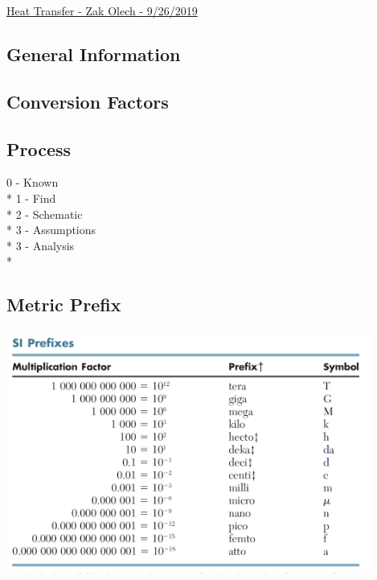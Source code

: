\documentclass[10pt,landscape]{article}
\newenvironment{Figure}
     {\par\medskip\noindent\minipage{\linewidth}}
     {\endminipage\par\medskip}
\begin{document}
\raggedright
\footnotesize


\begin{center}
     \Large{\underline{Heat Transfer - Zak Olech - 9/26/2019}}
\end{center}
\begin{multicols}{3}

\setlength{\columnseprule}{0.25pt}
\setlength{\premulticols}{1pt}
\setlength{\postmulticols}{1pt}
\setlength{\multicolsep}{1pt}
\setlength{\columnsep}{2pt}


\section{General Information}
\subsection{Conversion Factors}

\subsection{Process}
0 - Known\\*
1 - Find\\*
2 - Schematic\\*
3 - Assumptions\\*
3 - Analysis\\*
\subsection{Metric Prefix}
\begin{Figure}
    \centering
    \includegraphics[width=\linewidth, height=8cm]{SI_Prefix.png}
\end{Figure}


\end{multicols}
\end{document}
